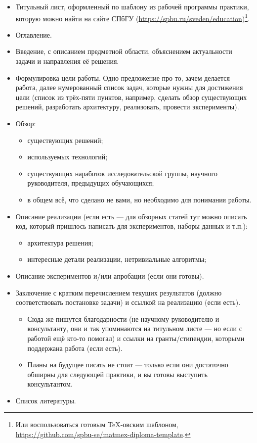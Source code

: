 \documentclass{article}
\begin{document}
\begin{itemize}
    \item Титульный лист, оформленный по шаблону из рабочей программы практики, которую можно найти на сайте СПбГУ (\url{https://spbu.ru/sveden/education})\footnote{Или воспользоваться готовым TeX-овским шаблоном, \url{https://github.com/spbu-se/matmex-diploma-template}.}.
    \item Оглавление.
    \item Введение, с описанием предметной области, объяснением актуальности задачи и направления её решения.
    \item Формулировка цели работы. Одно предложение про то, зачем делается работа, далее нумерованный список задач, которые нужны для достижения цели (список из трёх-пяти пунктов, например, сделать обзор существующих решений, разработать архитектуру, реализовать, провести эксперименты).
    \item Обзор:
    \begin{itemize}
        \item существующих решений;
        \item используемых технологий;
        \item существующих наработок исследовательской группы, научного руководителя, предыдущих обучающихся;
        \item в общем всё, что сделано не вами, но необходимо для понимания работы.
    \end{itemize}
    \item Описание реализации (если есть --- для обзорных статей тут можно описать код, который пришлось написать для экспериментов, наборы данных и т.п.):
    \begin{itemize}
        \item архитектура решения;
        \item интересные детали реализации, нетривиальные алгоритмы;
    \end{itemize}
    \item Описание экспериментов и/или апробации (если они готовы).
    \item Заключение с кратким перечислением текущих результатов (должно соответствовать постановке задачи) и ссылкой на реализацию (если есть).
    \begin{itemize}
        \item Сюда же пишутся благодарности (не научному руководителю и консультанту, они и так упоминаются на титульном листе --- но если с работой ещё кто-то помогал) и ссылки на гранты/стипендии, которыми поддержана работа (если есть).
        \item Планы на будущее писать не стоит --- только если они достаточно обширны для следующей практики, и вы готовы выступить консультантом.
    \end{itemize}
    \item Список литературы.
\end{itemize}
\end{document}
